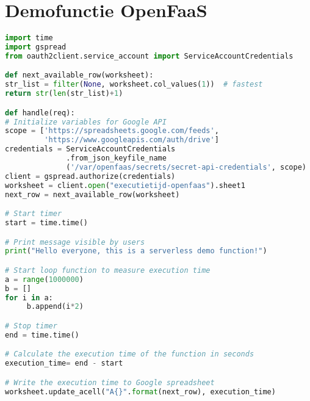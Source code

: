 \newpage
\section{Demofunctie OpenFaaS}
\label{sec:demofunctie-openfaas}
\begin{lstlisting}[language=python]
import time
import gspread
from oauth2client.service_account import ServiceAccountCredentials

def next_available_row(worksheet):
str_list = filter(None, worksheet.col_values(1))  # fastest
return str(len(str_list)+1)

def handle(req):   
# Initialize variables for Google API
scope = ['https://spreadsheets.google.com/feeds',
         'https://www.googleapis.com/auth/drive']
credentials = ServiceAccountCredentials
              .from_json_keyfile_name
              ('/var/openfaas/secrets/secret-api-credentials', scope)
client = gspread.authorize(credentials)
worksheet = client.open("executietijd-openfaas").sheet1
next_row = next_available_row(worksheet)

# Start timer 
start = time.time()

# Print message visible by users
print("Hello everyone, this is a serverless demo function!")

# Start loop function to measure execution time
a = range(1000000)
b = []
for i in a:
     b.append(i*2)

# Stop timer
end = time.time()

# Calculate the execution time of the function in seconds
execution_time= end - start

# Write the execution time to Google spreadsheet
worksheet.update_acell("A{}".format(next_row), execution_time)
\end{lstlisting}
